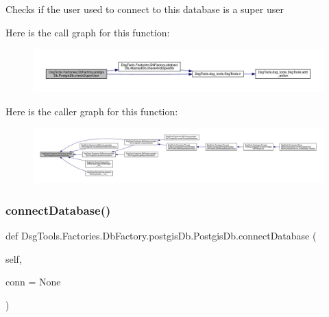 \begin{DoxyVerb}Checks if the user used to connect to this database is a super user
\end{DoxyVerb}
 Here is the call graph for this function\+:
\nopagebreak
\begin{figure}[H]
\begin{center}
\leavevmode
\includegraphics[width=350pt]{class_dsg_tools_1_1_factories_1_1_db_factory_1_1postgis_db_1_1_postgis_db_ad207ce5d993c5c3b3d1cc8dcc1403f7d_cgraph}
\end{center}
\end{figure}
Here is the caller graph for this function\+:
\nopagebreak
\begin{figure}[H]
\begin{center}
\leavevmode
\includegraphics[width=350pt]{class_dsg_tools_1_1_factories_1_1_db_factory_1_1postgis_db_1_1_postgis_db_ad207ce5d993c5c3b3d1cc8dcc1403f7d_icgraph}
\end{center}
\end{figure}
\mbox{\label{class_dsg_tools_1_1_factories_1_1_db_factory_1_1postgis_db_1_1_postgis_db_aefc6ec43dd4d6e8f63d43e3f36f7cba2}} 
\subsubsection{\texorpdfstring{connect\+Database()}{connectDatabase()}}
{\footnotesize\ttfamily def Dsg\+Tools.\+Factories.\+Db\+Factory.\+postgis\+Db.\+Postgis\+Db.\+connect\+Database (\begin{DoxyParamCaption}\item[{}]{self,  }\item[{}]{conn = {\ttfamily None} }\end{DoxyParamCaption})}

